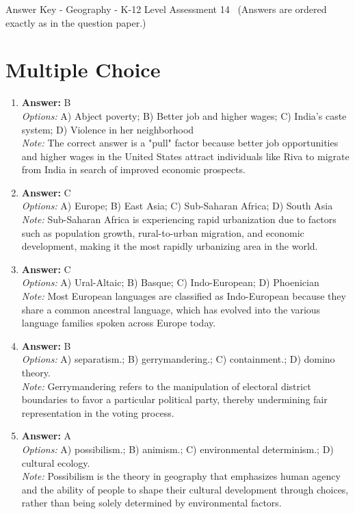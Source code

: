 \documentclass[12pt]{article}
\begin{document}
\begin{center}
Answer Key - Geography - K-12 Level Assessment 14 \
\small (Answers are ordered exactly as in the question paper.)
\end{center}

\section*{Multiple Choice}
\begin{enumerate}[label=\arabic*.]
\item \textbf{Answer:} B
\\ \textit{Options:} A) Abject poverty; B) Better job and higher wages; C) India's caste system; D) Violence in her neighborhood
\\ \textit{Note:} The correct answer is a "pull" factor because better job opportunities and higher wages in the United States attract individuals like Riva to migrate from India in search of improved economic prospects.
\item \textbf{Answer:} C
\\ \textit{Options:} A) Europe; B) East Asia; C) Sub-Saharan Africa; D) South Asia
\\ \textit{Note:} Sub-Saharan Africa is experiencing rapid urbanization due to factors such as population growth, rural-to-urban migration, and economic development, making it the most rapidly urbanizing area in the world.
\item \textbf{Answer:} C
\\ \textit{Options:} A) Ural-Altaic; B) Basque; C) Indo-European; D) Phoenician
\\ \textit{Note:} Most European languages are classified as Indo-European because they share a common ancestral language, which has evolved into the various language families spoken across Europe today.
\item \textbf{Answer:} B
\\ \textit{Options:} A) separatism.; B) gerrymandering.; C) containment.; D) domino theory.
\\ \textit{Note:} Gerrymandering refers to the manipulation of electoral district boundaries to favor a particular political party, thereby undermining fair representation in the voting process.
\item \textbf{Answer:} A
\\ \textit{Options:} A) possibilism.; B) animism.; C) environmental determinism.; D) cultural ecology.
\\ \textit{Note:} Possibilism is the theory in geography that emphasizes human agency and the ability of people to shape their cultural development through choices, rather than being solely determined by environmental factors.
\end{enumerate}
\end{document}
